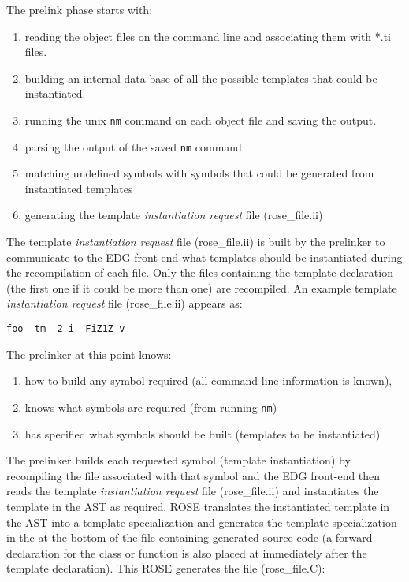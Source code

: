 {   The prelink phase starts with:
\begin{enumerate}
   \item reading the object files on the command line and associating them with *.ti files.  
   \item building an internal data base of all the possible templates that could be instantiated.
   \item running the unix {\tt nm} command on each object file and saving the output.
   \item parsing the output of the saved {\tt nm} command
   \item matching undefined symbols with symbols that could be generated from instantiated templates
   \item generating the template {\em instantiation request} file (rose\_file.ii)
\end{enumerate}

The template {\em instantiation request} file (rose\_file.ii) is built by the prelinker 
to communicate to the EDG front-end what templates should be instantiated during the 
recompilation of each file.  Only the files containing the template declaration
(the first one if it could be more than one) are recompiled.  An example template 
{\em instantiation request} file (rose\_file.ii) appears as:

{\indent
{\mySmallFontSize

\begin{verbatim}
foo__tm__2_i__FiZ1Z_v
\end{verbatim}
}}

   The prelinker at this point knows:
\begin{enumerate}
   \item how to build any symbol required (all command line information is known),
   \item knows what symbols are required (from running {\tt nm})
   \item has specified what symbols should be built (templates to be instantiated)
\end{enumerate}

  The prelinker builds each requested symbol (template instantiation) by recompiling
the file associated with that symbol and the EDG front-end then reads the template 
{\em instantiation request} file (rose\_file.ii) and instantiates the template
in the AST as required.  ROSE translates the instantiated template in the AST into
a template specialization and generates the template specialization in the 
at the bottom of the file containing generated source code (a forward declaration
for the class or function is also placed at immediately after the template declaration).
This ROSE generates the file (rose\_file.C):

}
